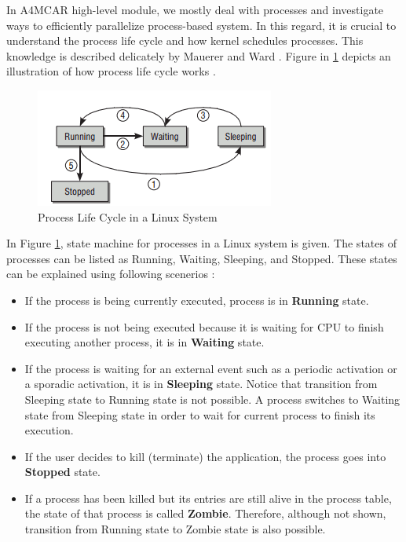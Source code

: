 In A4MCAR high-level module, we mostly deal with processes and investigate ways to efficiently parallelize process-based system. In this regard, it is crucial to understand the process life cycle and how kernel schedules processes. This knowledge is described delicately by Mauerer \cite{linuxkernelbook} and Ward \cite{howlinuxworksbook}. Figure in \ref{fig:processlifecycle} depicts an illustration of how process life cycle works \cite{linuxkernelbook}.
\begin{figure}[!ht]
	\includegraphics[scale=1]{content/images/processlifecycle.png}
	\caption{Process Life Cycle in a Linux System \cite{linuxkernelbook}}
	\label{fig:processlifecycle}
\end{figure}

In Figure \ref{fig:processlifecycle}, state machine for processes in a Linux system is given. The states of processes can be listed as Running, Waiting, Sleeping, and Stopped. These states can be explained using following scenerios \cite{linuxkernelbook}:
\begin{itemize}
	\item If the process is being currently executed, process is in \textbf{Running} state.
	\item If the process is not being executed because it is waiting for CPU to finish executing another process, it is in \textbf{Waiting} state.
	\item If the process is waiting for an external event such as a periodic activation or a sporadic activation, it is in \textbf{Sleeping} state. Notice that transition from Sleeping state to Running state is not possible. A process switches to Waiting state from Sleeping state in order to wait for current process to finish its execution.
	\item If the user decides to kill (terminate) the application, the process goes into \textbf{Stopped} state.
	\item If a process has been killed but its entries are still alive in the process table, the state of that process is called \textbf{Zombie}. Therefore, although not shown, transition from Running state to Zombie state is also possible.
\end{itemize}

